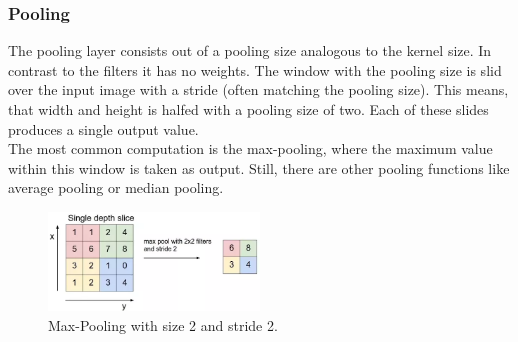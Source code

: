 \documentclass[
     11pt,         %
     a4paper,      %
     oneside,
     ]{article}
\begin{document}
\subsubsection{Pooling}
The pooling layer consists out of a pooling size analogous to the kernel size. In contrast to the filters it has no weights. The window with the pooling size is slid over the input image with a stride (often matching the pooling size). This means, that width and height is halfed with a pooling size of two. Each of these slides produces a single output value.\\
The most common computation is the max-pooling, where the maximum value within this window is taken as output. Still, there are other pooling functions like average pooling or median pooling. \cite{neuralnetworksanddeeplearning}
\begin{figure}[H]
  \begin{center}
    \includegraphics[width=0.5\textwidth]{images/pooling.png}
    \caption{Max-Pooling with size 2 and stride 2.\cite{pool1}}
    \label{fig:pool}
  \end{center}
\end{figure}
\end{document}
